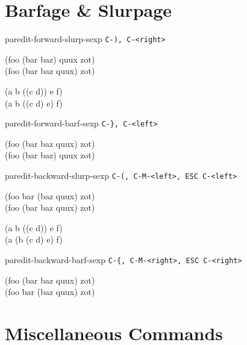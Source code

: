 \documentclass[8pt,landscape,a4paper]{article}
\begin{document}
\begin{multicols}{4}
    \section*{Barfage \& Slurpage}

paredit-forward-slurp-sexp \texttt{C-), C-<right>}

{\ttfamily
(foo (bar \cursor baz) quux zot)\\
(foo (bar \cursor baz quux) zot)

(a b ((c\cursor{} d)) e f)\\
(a b ((c\cursor{} d) e) f)
}

paredit-forward-barf-sexp \texttt{C-\}, C-<left>}

{\ttfamily
(foo (bar \cursor baz quux) zot)\\
(foo (bar \cursor baz) quux zot)
}

paredit-backward-slurp-sexp \texttt{C-(, C-M-<left>, ESC C-<left>}

{\ttfamily
(foo bar (baz\cursor{} quux) zot)\\
(foo (bar\cursor{} baz quux) zot)

(a b ((c\cursor{} d)) e f)\\
(a (b (c\cursor{} d) e) f)
}

paredit-backward-barf-sexp \texttt{C-\{, C-M-<right>, ESC C-<right>}

{\ttfamily
(foo (bar baz \cursor quux) zot)\\
(foo bar (baz \cursor quux) zot)
}

    \section*{Miscellaneous Commands}

  \end{multicols}
\end{document}
